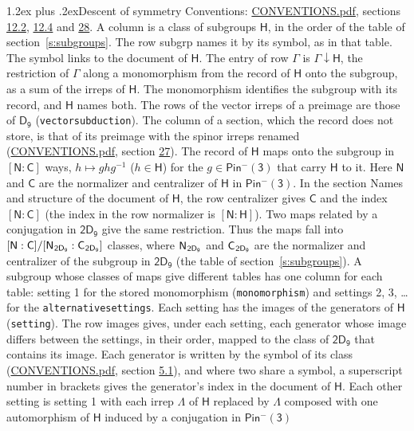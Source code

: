 \documentclass[10pt,a4paper]{article}
\makeatletter
\renewcommand\section{\@startsection{section}{1}{\z@}{-3ex plus -1ex minus -.2ex}%
  {1.2ex plus .2ex}{\normalfont\large\sffamily\bfseries\color{parttitle}}}
\numberwithin{equation}{section}
\newcommand{\grp}[1]{\mathsf{#1}}
\newcommand{\grpindex}[2]{[#1 : #2]}
\newcommand{\restr}[2]{#1\!\downarrow#2}
\newcommand{\hairsp}{\mkern1mu}
\makeatother
\begin{document}
\section{Descent of symmetry}\label{s:subduction}
Conventions: \href{../../CONVENTIONS.pdf}{CONVENTIONS.pdf}, sections \href{../../../rotation/CONVENTIONS.pdf\#conv.12.2}{12.2}, \href{../../../rotation/CONVENTIONS.pdf\#conv.12.4}{12.4} and \href{../../CONVENTIONS.pdf\#conv.28}{28}.
A column is a class of subgroups $\grp{H}$, in the order of the table of section~\ref{s:subgroups}. The row subgrp names it by its symbol, as in that table. The symbol links to the document of $\grp{H}$. The entry of row $\Gamma$ is $\restr{\Gamma}{\grp{H}}$, the restriction of $\Gamma$ along a monomorphism from the record of $\grp{H}$ onto the subgroup, as a sum of the irreps of $\grp{H}$. The monomorphism identifies the subgroup with its record, and $\grp{H}$ names both. The rows of the vector irreps of a preimage are those of \href{../../../rotation/data/pdf/D9.pdf}{$\grp{D_{9}}$} (\texttt{vectorsubduction}). The column of a section, which the record does not store, is that of its preimage with the spinor irreps renamed (\href{../../CONVENTIONS.pdf}{CONVENTIONS.pdf}, section \href{../../CONVENTIONS.pdf\#conv.27}{27}). \label{n:group.normalizer.o3}\label{n:group.centralizer.o3}\label{n:element.h}The record of $\grp{H}$ maps onto the subgroup in $\grpindex{\grp{N}}{\grp{C}}$ ways, $h \mapsto g h g^{-1}$ ($h \in \grp{H}$) for the $g \in \grp{Pin^{-}(3)}$ that carry $\grp{H}$ to it. Here $\grp{N}$ and $\grp{C}$ are the normalizer and centralizer of $\grp{H}$ in \href{Pinminus3.pdf}{$\grp{Pin^{-}(3)}$}. In the section Names and structure of the document of $\grp{H}$, the row centralizer gives $\grp{C}$ and the index $\grpindex{\grp{N}}{\grp{C}}$ (the index in the row normalizer is $\grpindex{\grp{N}}{\grp{H}}$). Two maps related by a conjugation in $\grp{2D_{9}}$ give the same restriction. Thus the maps fall into $\grpindex{\grp{N}}{\grp{C}}/\grpindex{\grp{N}_{\hairsp \grp{2D_{9}}}}{\grp{C}_{\hairsp \grp{2D_{9}}}}$ classes, where $\grp{N}_{\hairsp \grp{2D_{9}}}$ and $\grp{C}_{\hairsp \grp{2D_{9}}}$ are the normalizer and centralizer of the subgroup in $\grp{2D_{9}}$ (the table of section~\ref{s:subgroups}). \label{n:head.setting}A subgroup whose classes of maps give different tables has one column for each table: setting 1 for the stored monomorphism (\texttt{monomorphism}) and settings 2, 3, \dots{} for the \texttt{alternativesettings}. Each setting has the images of the generators of $\grp{H}$ (\texttt{setting}). \label{n:head.images}The row images gives, under each setting, each generator whose image differs between the settings, in their order, mapped to the class of $\grp{2D_{9}}$ that contains its image. Each generator is written by the symbol of its class (\href{../../CONVENTIONS.pdf}{CONVENTIONS.pdf}, section \href{../../../rotation/CONVENTIONS.pdf\#conv.5.1}{5.1}), and where two share a symbol, a superscript number in brackets gives the generator's index in the document of $\grp{H}$. \label{n:irrep.Delta}Each other setting is setting 1 with each irrep $\Lambda$ of $\grp{H}$ replaced by $\Lambda$ composed with one automorphism of $\grp{H}$ induced by a conjugation in \href{Pinminus3.pdf}{$\grp{Pin^{-}(3)}$} 
\end{document}
